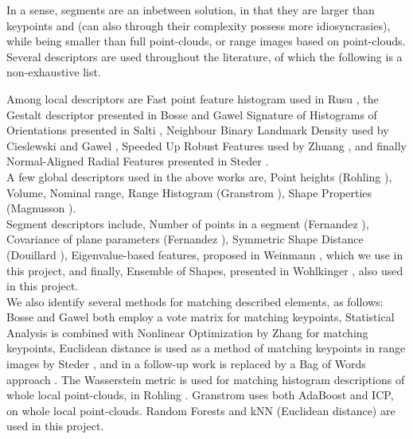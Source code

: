 In a sense, segments are an inbetween solution, in that they are larger than keypoints and (can also through their complexity possess more idiosyncrasies), while being smaller than full point-clouds, or range images based on point-clouds.\\


Several descriptors are used throughout the literature, of which the following is a non-exhaustive list.

Among local descriptors are 
Fast point feature histogram used in Rusu \cite{rusu2009fast}, 
the Gestalt descriptor presented in Bosse \cite{bosse2013place} and Gawel \cite{Gawel2016}
Signature of Histograms of Orientations presented in Salti \cite{salti2014shot},
Neighbour Binary Landmark Density used by Cieslewski \cite{cieslewski2016point} and Gawel \cite{Gawel2016},
Speeded Up Robust Features used by Zhuang \cite{zhuang20133}, and finally 
Normal-Aligned Radial Features presented in Steder \cite{steder2011place}.\\

A few global descriptors used in the above works are,
Point heights (Rohling \cite{rohling2015fast}),
Volume, Nominal range, Range Histogram (Granstrom \cite{granstrom2011learning}),
Shape Properties (Magnusson \cite{magnusson2009automatic}).\\

Segment descriptors include,
Number of points in a segment (Fernandez \cite{fernandez2013fast}),
Covariance of plane parameters (Fernandez \cite{fernandez2016scene}),
Symmetric Shape Distance (Douillard \cite{douillard2012scan}),
Eigenvalue-based features, proposed in Weinmann \cite{weinmann2014semantic}, which we use in this project,
and finally,
Ensemble of Shapes, presented in Wohlkinger \cite{wohlkinger2011ensemble}, also used in this project.\\


We also identify several methods for matching described elements, as follows:\\


Bosse \cite{bosse2013place} and Gawel \cite{Gawel2016} both employ a vote matrix for matching keypoints,
Statistical Analysis is combined with Nonlinear Optimization by Zhang \cite{zhang2014loam} for matching keypoints,
Euclidean distance is used as a method of matching keypoints in range images by Steder \cite{steder2010robust},
and in a follow-up work is replaced by a Bag of Words approach \cite{steder2011place}.
The Wasserstein metric is used for matching histogram descriptions of whole local point-clouds, in Rohling \cite{rohling2015fast}.
Granstrom \cite{granstrom2011learning} uses both AdaBoost and ICP, on whole local point-clouds.
Random Forests and kNN (Euclidean distance) are used in this project.\\

